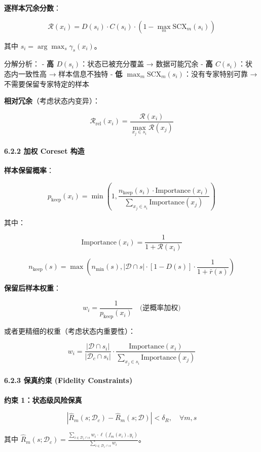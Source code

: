 \documentclass[
  12pt,
]{ctexart}
\begin{document}
\textbf{逐样本冗余分数}：

\[
\mathcal{R}(x_i) = D(s_i) \cdot C(s_i) \cdot \left(1 - \max_m \text{SCX}_m(s_i)\right)
\]

其中 \(s_i = \arg\max_s \gamma_s(x_i)\)。

分解分析： - \textbf{高 \(D(s_i)\)}：状态已被充分覆盖 → 数据可能冗余 -
\textbf{高 \(C(s_i)\)}：状态内一致性高 → 样本信息不独特 - \textbf{低
\(\max_m \text{SCX}_m(s_i)\)}：没有专家特别可靠 →
不需要保留专家特定的样本

\textbf{相对冗余}（考虑状态内变异）：

\[
\mathcal{R}_{\text{rel}}(x_i) = \frac{\mathcal{R}(x_i)}{\max_{x_j \in s_i} \mathcal{R}(x_j)}
\]

\paragraph{6.2.2 加权 Coreset
构造}\label{ux52a0ux6743-coreset-ux6784ux9020}

\textbf{样本保留概率}：

\[
p_{\text{keep}}(x_i) = \min\left(1, \frac{n_{\text{keep}}(s_i) \cdot \text{Importance}(x_i)}{\sum_{x_j \in s_i} \text{Importance}(x_j)}\right)
\]

其中：

\[
\text{Importance}(x_i) = \frac{1}{1 + \mathcal{R}(x_i)}
\]

\[
n_{\text{keep}}(s) = \max\left(n_{\min}(s), |\mathcal{D} \cap s| \cdot [1 - D(s)] \cdot \frac{1}{1 + \bar{r}(s)}\right)
\]

\textbf{保留后样本权重}：

\[
w_i = \frac{1}{p_{\text{keep}}(x_i)} \quad \text{(逆概率加权)}
\]

或者更精细的权重（考虑状态内重要性）：

\[
w_i = \frac{|\mathcal{D} \cap s_i|}{|\mathcal{D}_c \cap s_i|} \cdot \frac{\text{Importance}(x_i)}{\sum_{x_j \in s_i} \text{Importance}(x_j)}
\]

\paragraph{6.2.3 保真约束 (Fidelity
Constraints)}\label{ux4fddux771fux7ea6ux675f-fidelity-constraints}

\textbf{约束 1：状态级风险保真}

\[
\left| \hat{R}_m(s; \mathcal{D}_c) - \hat{R}_m(s; \mathcal{D}) \right| < \delta_R, \quad \forall m,s
\]

其中
\(\hat{R}_m(s; \mathcal{D}_c) = \frac{\sum_{i \in \mathcal{D}_c \cap s} w_i \cdot \ell(f_m(x_i), y_i)}{\sum_{i \in \mathcal{D}_c \cap s} w_i}\)。
\end{document}
